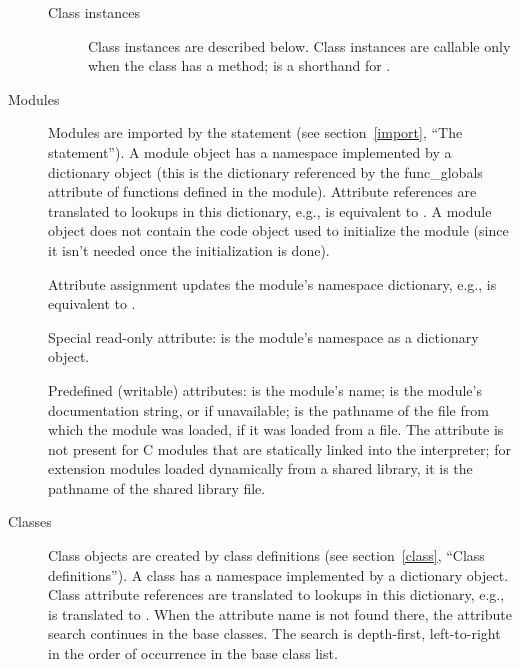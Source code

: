 \begin{description}
\begin{description}
\item[Class instances]
Class instances are described below.  Class instances are callable
only when the class has a  method; 
is a shorthand for .

\end{description}

\item[Modules]
Modules are imported by the  statement (see
section~\ref{import}, ``The  statement'').%
A module object has a namespace implemented by a dictionary object
(this is the dictionary referenced by the func_globals attribute of
functions defined in the module).  Attribute references are translated
to lookups in this dictionary, e.g.,  is equivalent to
.
A module object does not contain the code object used to
initialize the module (since it isn't needed once the initialization
is done).

Attribute assignment updates the module's namespace dictionary,
e.g.,  is equivalent to .

Special read-only attribute:  is the module's
namespace as a dictionary object.

Predefined (writable) attributes: 
is the module's name;  is the
module's documentation string, or
 if unavailable;  is the pathname of the
file from which the module was loaded, if it was loaded from a file.
The  attribute is not present for C{} modules that are
statically linked into the interpreter; for extension modules loaded
dynamically from a shared library, it is the pathname of the shared
library file.

\item[Classes]
Class objects are created by class definitions (see
section~\ref{class}, ``Class definitions'').
A class has a namespace implemented by a dictionary object.
Class attribute references are translated to
lookups in this dictionary,
e.g.,  is translated to .
When the attribute name is not found
there, the attribute search continues in the base classes.  The search
is depth-first, left-to-right in the order of occurrence in the
base class list.


\end{description}
